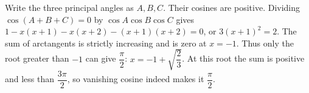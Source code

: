 Write the three principal angles as $A,B,C$. Their cosines are positive. Dividing $\cos(A+B+C)=0$ by $\cos A\cos B\cos C$ gives $1-x(x+1)-x(x+2)-(x+1)(x+2)=0$, or $3(x+1)^2=2$. The sum of arctangents is strictly increasing and is zero at $x=-1$. Thus only the root greater than $-1$ can give $\dfrac{\pi}{2}$: $\boxed{x=-1+\sqrt{\dfrac{2}{3}}}$. At this root the sum is positive and less than $\dfrac{3\pi}{2}$, so vanishing cosine indeed makes it $\dfrac{\pi}{2}$.
